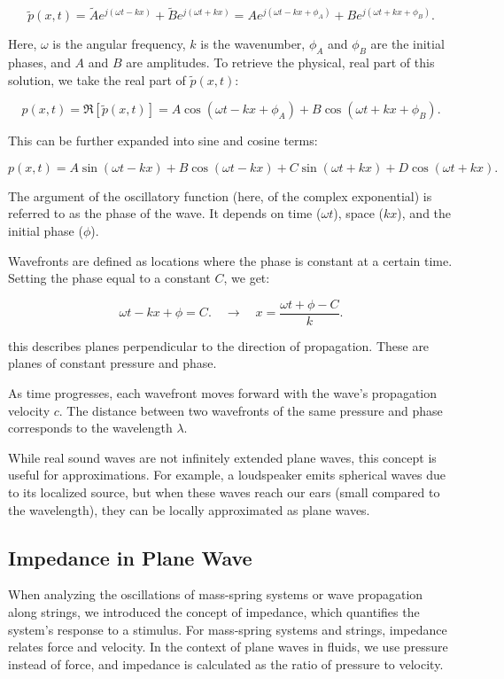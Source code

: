 \documentclass[a4paper]{article}
\begin{document}
\[
\tilde{p}(x, t) = \tilde{A} e^{j(\omega t - kx)} + \tilde{B} e^{j(\omega t + kx)} = A e^{j(\omega t - kx + \phi_A)} + B e^{j(\omega t + kx + \phi_B)}.
\]

Here, \(\omega\) is the angular frequency, \(k\) is the wavenumber, \(\phi_A\) and \(\phi_B\) are the initial phases, and \(A\) and \(B\) are amplitudes. To retrieve the physical, real part of this solution, we take the real part of \(\tilde{p}(x, t)\):

\[
p(x, t) = \Re[\tilde{p}(x, t)] = A \cos(\omega t - kx + \phi_A) + B \cos(\omega t + kx + \phi_B).
\]

This can be further expanded into sine and cosine terms:

\[
p(x, t) = A \sin(\omega t - kx) + B \cos(\omega t - kx) + C \sin(\omega t + kx) + D \cos(\omega t + kx).
\]

The argument of the oscillatory function (here, of the complex exponential) is referred to as the phase of the wave. It depends on time (\(\omega t\)), space (\(kx\)), and the initial phase (\(\phi\)). 

Wavefronts are defined as locations where the phase is constant at a certain time. Setting the phase equal to a constant \(C\), we get:

\[
\omega t - kx + \phi = C. \quad \to \quad x = \frac{\omega t + \phi - C}{k}.
\]

this describes planes perpendicular to the direction of propagation. These are planes of constant pressure and phase.

As time progresses, each wavefront moves forward with the wave's propagation velocity \(c\). The distance between two wavefronts of the same pressure and phase corresponds to the wavelength \(\lambda\). 

While real sound waves are not infinitely extended plane waves, this concept is useful for approximations. For example, a loudspeaker emits spherical waves due to its localized source, but when these waves reach our ears (small compared to the wavelength), they can be locally approximated as plane waves.

\subsection{Impedance in Plane Wave}

When analyzing the oscillations of mass-spring systems or wave propagation along strings, we introduced the concept of impedance, which quantifies the system's response to a stimulus. For mass-spring systems and strings, impedance relates force and velocity. In the context of plane waves in fluids, we use pressure instead of force, and impedance is calculated as the ratio of pressure to velocity.
\end{document}
